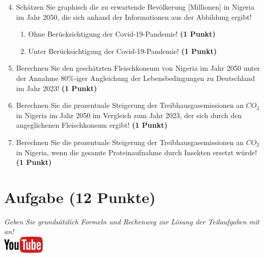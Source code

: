\documentclass[a4paper, 9pt]{scrartcl}\usepackage[]{graphicx}\usepackage[]{xcolor}
\begin{document}
\begin{enumerate}
  \setcounter{enumi}{3}  
\item Sch{\"a}tzen Sie graphisch die zu erwartende Bev{\"o}lkerung [Millionen] in Nigeria im
  Jahr 2050, die sich anhand der Informationen aus der Abbildung ergibt!
\begin{enumerate}
\item Ohne Ber{\"u}cksichtigung der Covid-19-Pandemie! \textbf{(1
    Punkt)}
\item Unter Ber{\"u}cksichtigung der Covid-19-Pandemie! \textbf{(1
    Punkt)}
\end{enumerate}
\item Berechnen Sie den gesch{\"a}tzten Fleischkonsum von Nigeria im Jahr
  2050 unter der Annahme 80\%-iger Angleichung der Lebensbedingungen zu
  Deutschland im Jahr 2023! \textbf{(1 Punkt)}
\item Berechnen Sie die prozentuale Steigerung der Treibhausgasemissionen
  an $CO_2$ in Nigeria im Jahr 2050 im Vergleich zum Jahr 2023, der
  sich durch den angeglichenen Fleischkonsum ergibt! \textbf{(1 Punkt)}
\item Berechnen Sie die prozentuale Steigerung der Treibhausgasemissionen
  an $CO_2$ in Nigeria, wenn die gesamte Proteinaufnahme 
  durch Insekten ersetzt w{\"u}rde! \textbf{(1
    Punkt)}
\end{enumerate}







 
\clearpage

\section{Aufgabe \hfill (12 Punkte)}

\textit{Geben Sie grunds{\"a}tzlich Formeln und Rechenweg zur L{\"o}sung der
  Teilaufgaben mit an!} \\[1Ex]

\hfill\href{https://youtu.be/flRBo1FWQy0}{\includegraphics[width = 2cm]{img/youtube}} %
\hspace{2Ex}
\end{document}
